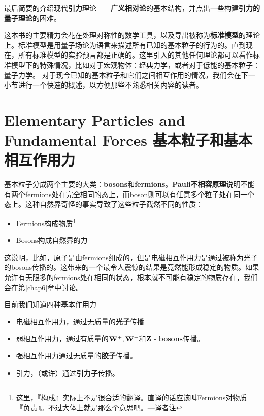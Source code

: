 最后简要的介绍现代{\bf 引力}理论——{\bf 广义相对论}的基本结构，并点出一些构建{\bf 引力的量子理论}的困难。

这本书的主要精力会花在处理对称性的数学工具，以及导出被称为{\bf 标准模型}的理论上。标准模型是用量子场论为语言来描述所有已知的基本粒子的行为的。直到现在，所有标准模型的实验预言都是正确的。这里引入的其他任何理论都可以看作标准模型下的特殊情况，比如对于宏观物体：经典力学，或者对于低能的基本粒子：量子力学。
对于现今已知的基本粒子和它们之间相互作用的情况，我们会在下一小节进行一个快速的概述，以方便那些不熟悉相关内容的读者。

\section[基本粒子和基本相互作用力]{Elementary Particles and Fundamental Forces 基本粒子和基本相互作用力}\label{sec1.3}

基本粒子分成两个主要的大类：{\bf bosons}和{\bf fermions}。{\bf Pauli不相容原理}说明不能有两个fermions处在完全相同的态上，而boson则可以有任意多个粒子处在同一个态上。这种自然界奇怪的事实导致了这些粒子截然不同的性质：

\begin{itemize}
\item Fermions构成物质\footnote{这里，『构成』实际上不是很合适的翻译。直译的话应该叫Fermions对物质『负责』。不过大体上就是那么个意思吧。---译者注}
\item Bosons构成自然界的力
\end{itemize}

这说明，比如，原子是由fermions组成的，但是电磁相互作用力是通过被称为光子的bosons传播的。这带来的一个最令人震惊的结果是竟然能形成稳定的物质。如果允许有无限多的fermions处在相同的状态，根本就不可能有稳定的物质存在，我们会在第\ref{chap6}章中讨论。

目前我们知道四种基本作用力

\begin{itemize}
\item 电磁相互作用力，通过无质量的{\bf 光子}传播
\item 弱相互作用力，通过有质量的$\bf W^+, W^-$和$\bf Z$ - {\bf bosons}传播。
\item 强相互作用力通过无质量的{\bf 胶子}传播。
\item 引力，（或许）通过{\bf 引力子}传播。
\end{itemize}

